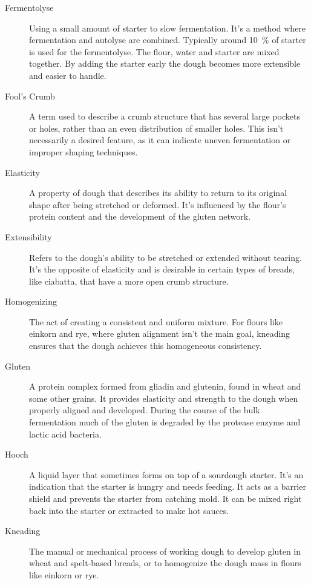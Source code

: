 \begin{description}
\item[Fermentolyse] Using a small amount of starter to slow fermentation.
It's a method where fermentation and autolyse are combined. Typically around \SI{10}{\percent}
of starter is used for the fermentolyse. The flour, water and starter are mixed
together. By adding the starter early the dough becomes more extensible and easier
to handle.

\item[Fool’s Crumb] A term used to describe a crumb structure that has several
large pockets or holes, rather than an even distribution of smaller holes. This
isn't necessarily a desired feature, as it can indicate uneven fermentation or
improper shaping techniques.

\item[Elasticity] A property of dough that describes its ability to return to
its original shape after being stretched or deformed. It's influenced by the flour's
protein content and the development of the gluten network.

\item[Extensibility] Refers to the dough’s ability to be stretched or extended
without tearing. It's the opposite of elasticity and is desirable in certain types
of breads, like ciabatta, that have a more open crumb structure.

\item[Homogenizing] The act of creating a consistent and uniform mixture. For
flours like einkorn and rye, where gluten alignment isn't the main goal, kneading
ensures that the dough achieves this homogeneous consistency.

\item[Gluten] A protein complex formed from gliadin and glutenin, found in wheat
and some other grains. It provides elasticity and strength to the dough when
properly aligned and developed. During the course of the bulk fermentation much of
the gluten is degraded by the protease enzyme and lactic acid bacteria.

\item[Hooch] A liquid layer that sometimes forms on top of a sourdough starter.
It's an indication that the starter is hungry and needs feeding. It acts as a
barrier shield and prevents the starter from catching mold. It can be mixed right
back into the starter or extracted to make hot sauces.

\item[Kneading] The manual or mechanical process of working dough to develop gluten
in wheat and spelt-based breads, or to homogenize the dough mass in flours like
einkorn or rye.


\end{description}
